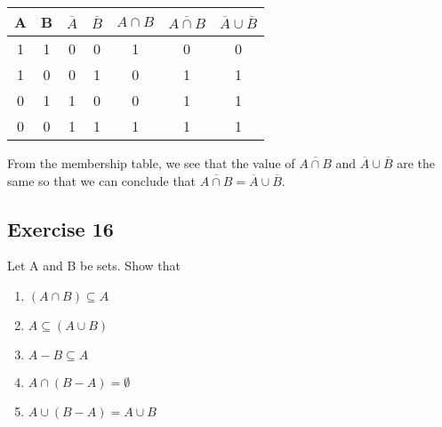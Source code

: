 \documentclass{article}
\theoremstyle{mytheoremstyle}
\theoremstyle{mytheoremstyle}
\theoremstyle{myproblemstyle}
\begin{document}
\begin{enumerate} [label = (\alph*)]
                \begin{center}
                    \begin{tabular}{|c|c|c|c|c|c|c|}
                        \hline
                        A & B & \(\overline{A}\) & \(\overline{B}\) & \(A \cap B\) & \(\overline{A \cap B}\) & \(\overline{A} \cup \overline{B}\)\\
                        \hline
                        1 & 1 & 0 & 0 & 1 & 0 & 0\\
                        \hline
                        1 & 0 & 0 & 1 & 0 & 1 & 1\\
                        \hline
                        0 & 1 & 1 & 0 & 0 & 1 & 1\\
                        \hline
                        0 & 0 & 1 & 1 & 1 & 1 & 1\\
                        \hline
                    \end{tabular}
                \end{center}
            From the membership table, we see that the value of \(\overline{A \cap B}\) and \(\overline{A} \cup \overline{B}\) are the same so that we can
            conclude that \(\overline{A \cap B} = \overline{A} \cup \overline{B}\).
        \end{enumerate}
    \subsection*{Exercise 16}
        Let A and B be sets. Show that
        \begin{enumerate} [label = (\alph*)]
            \item \((A \cap B) \subseteq A\)
            \item \(A \subseteq (A \cup B)\)
            \item \(A - B \subseteq A\)
            \item \(A \cap (B - A) = \emptyset\)
            \item \(A \cup (B - A) = A \cup B\)
        \end{enumerate}
\end{document}

